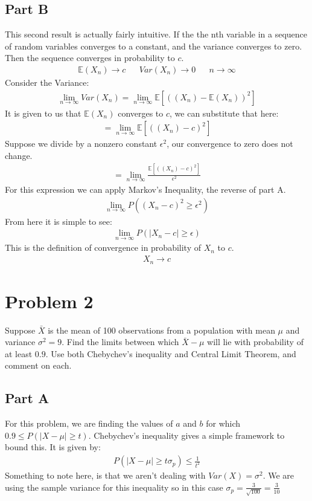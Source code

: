 \documentclass{article}
\begin{document}
\subsection*{Part B}
This second result is actually fairly intuitive. If the the nth variable in a sequence of random variables converges to a constant, and the variance converges to zero. Then the sequence converges in probability to $c$.
\begin{align*}
\mathbb{E}(X_n) \rightarrow c && Var(X_n) \rightarrow 0 && n \rightarrow \infty
\end{align*}
Consider the Variance:
\begin{align*}
\lim_{n\rightarrow \infty} Var(X_n) = \lim_{n\rightarrow \infty} \mathbb{E}[((X_n)-\mathbb{E}(X_n))^2]
\end{align*}
It is given to us that $\mathbb{E}(X_n)$ converges to $c$, we can substitute that here:
\begin{align*}
 = \lim_{n\rightarrow \infty} \mathbb{E}[((X_n)-c)^2]
\end{align*}
Suppose we divide by a nonzero constant $\epsilon^2$, our convergence to zero does not change.
\begin{align*}
 = \lim_{n\rightarrow \infty} \frac{\mathbb{E}[((X_n)-c)^2]}{\epsilon^2}
\end{align*}
For this expression we can apply Markov's Inequality, the reverse of part A.
\begin{align*}
\lim_{n\rightarrow \infty} P((X_n-c)^2 \geq \epsilon^2)
\end{align*}
From here it is simple to see:
\begin{align*}
\lim_{n\rightarrow \infty} P(|X_n-c| \geq \epsilon)
\end{align*}
This is the definition of convergence in probability of $X_n$ to $c$.
\begin{align*}
\boxed{ X_n \rightarrow c }
\end{align*}

\clearpage

\section*{Problem 2}
Suppose $\bar{X}$ is the mean of 100 observations from a population with mean $\mu$ and variance $\sigma^2 = 9$. Find the limits between which $\bar{X}-\mu$ will lie with probability of at least $0.9$. Use both Chebychev's inequality and Central Limit Theorem, and comment on each.
\subsection*{Part A}
For this problem, we are finding the values of $a$ and $b$ for which $0.9 \leq P(|X-\mu| \geq t)$. Chebychev's inequality gives a simple framework to bound this. It is given by: 
\begin{align*}
P(|X-\mu| \geq t\sigma_p) \leq \frac{1}{t^2}
\end{align*}
Something to note here, is that we aren't dealing with $Var(X)=\sigma^2$. We are using the sample variance for this inequality so in this case $\sigma_p=\tfrac{3}{\sqrt{100}}=\tfrac{3}{10}$
\end{document}
